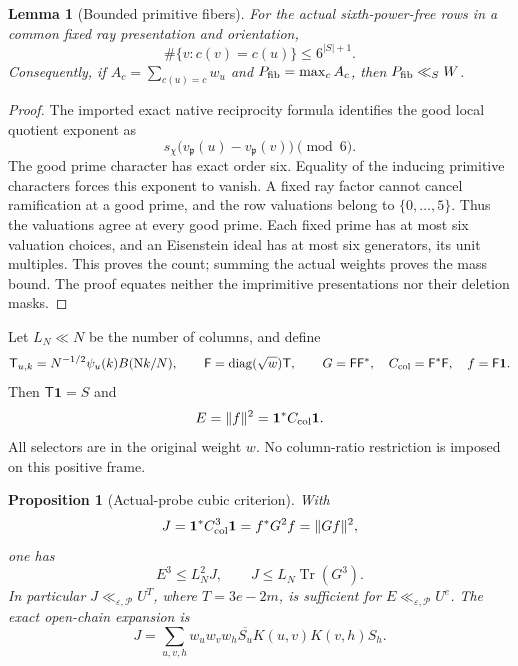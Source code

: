 \documentclass[11pt]{article}
\newtheorem{proposition}[theorem]{Proposition}
\newtheorem{lemma}[theorem]{Lemma}
\theoremstyle{definition}
\newcommand{\N}{\mathrm N}
\newcommand{\eps}{\varepsilon}
\newcommand{\lls}{\ll_{\eps,\mathcal P}}
\begin{document}
\begin{lemma}[Bounded primitive fibers]\label{early-lem-fibers}
For the actual sixth-power-free rows in a common fixed ray
presentation and orientation,
\[
 \#\{v:c(v)=c(u)\}\le6^{|S|+1}.
\]
Consequently, if \(A_c=\sum_{c(u)=c}w_u\) and
\(P_{\rm fib}=\max_c A_c\), then \(P_{\rm fib}\ll_S W\).
\end{lemma}

\begin{proof}
The imported exact native reciprocity formula identifies the good local
quotient exponent as
\[
 s_\chi\bigl(v_{\mathfrak p}(u)-v_{\mathfrak p}(v)\bigr)\pmod6.
\]
The good prime character has exact order six.  Equality of the inducing
primitive characters forces this exponent to vanish.  A fixed ray
factor cannot cancel ramification at a good prime, and the row
valuations belong to \(\{0,\ldots,5\}\).  Thus the valuations agree at
every good prime.  Each fixed prime has at most six valuation choices,
and an Eisenstein ideal has at most six generators, its unit multiples.
This proves the count; summing the actual weights proves the mass
bound.  The proof equates neither the imprimitive presentations nor
their deletion masks.
\end{proof}

Let \(L_N\ll N\) be the number of columns, and define
\[
 \mathsf T_{u,k}=N^{-1/2}\psi_u(k)B(\N k/N),\qquad
 \mathsf F=\operatorname{diag}(\sqrt w)\mathsf T,\qquad
 G=\mathsf F\mathsf F^*,\quad C_{\rm col}=\mathsf F^*\mathsf F,
 \quad f=\mathsf F\mathbf1.
\]
Then \(\mathsf T\mathbf1=S\) and
\begin{equation}\label{early-eq-energy-frame}
 E=\|f\|^2=\mathbf1^*C_{\rm col}\mathbf1.
\end{equation}
All selectors are in the original weight \(w\).
No column-ratio restriction is imposed on this positive frame.

\begin{proposition}[Actual-probe cubic criterion]\label{early-prop-probe}
With
\[
 J=\mathbf1^*C_{\rm col}^3\mathbf1
       =f^*G^2f=\|Gf\|^2,
\]
one has
\begin{equation}\label{early-eq-probe-jensen}
 E^3\le L_N^2J,\qquad
 J\le L_N\operatorname{Tr}(G^3).
\end{equation}
In particular \(J\lls U^T\), where \(T=3e-2m\), is sufficient for
\(E\lls U^e\).  The exact open-chain expansion is
\begin{equation}\label{early-eq-chain}
 J=\sum_{u,v,h}w_uw_vw_h
       \overline{S_u}K(u,v)K(v,h)S_h.
\end{equation}
\end{proposition}
\end{document}
